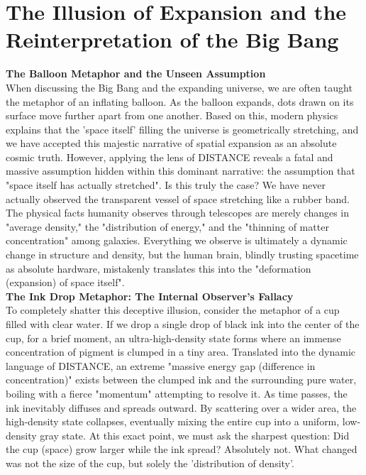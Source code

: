 

\section{The Illusion of Expansion and the Reinterpretation of the Big Bang}
\textbf{The Balloon Metaphor and the Unseen Assumption} \\
When discussing the Big Bang and the expanding universe, we are often taught the metaphor of an inflating balloon. As the balloon expands, dots drawn on its surface move further apart from one another. Based on this, modern physics explains that the 'space itself' filling the universe is geometrically stretching, and we have accepted this majestic narrative of spatial expansion as an absolute cosmic truth.
However, applying the lens of DISTANCE reveals a fatal and massive assumption hidden within this dominant narrative: the assumption that "space itself has actually stretched". Is this truly the case? We have never actually observed the transparent vessel of space stretching like a rubber band. The physical facts humanity observes through telescopes are merely changes in "average density," the "distribution of energy," and the "thinning of matter concentration" among galaxies. Everything we observe is ultimately a dynamic change in structure and density, but the human brain, blindly trusting spacetime as absolute hardware, mistakenly translates this into the "deformation (expansion) of space itself".\\
\textbf{The Ink Drop Metaphor: The Internal Observer's Fallacy} \\
To completely shatter this deceptive illusion, consider the metaphor of a cup filled with clear water.
If we drop a single drop of black ink into the center of the cup, for a brief moment, an ultra-high-density state forms where an immense concentration of pigment is clumped in a tiny area. Translated into the dynamic language of DISTANCE, an extreme "massive energy gap (difference in concentration)" exists between the clumped ink and the surrounding pure water, boiling with a fierce "momentum" attempting to resolve it.
As time passes, the ink inevitably diffuses and spreads outward. By scattering over a wider area, the high-density state collapses, eventually mixing the entire cup into a uniform, low-density gray state. At this exact point, we must ask the sharpest question: Did the cup (space) grow larger while the ink spread? Absolutely not. What changed was not the size of the cup, but solely the 'distribution of density'.
